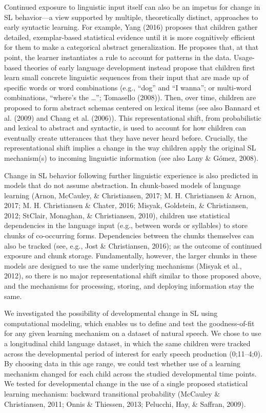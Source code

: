 \documentclass[man,mask,floatsintext]{apa6}
\begin{document}
Continued exposure to linguistic input itself can also be an impetus for
change in SL behavior---a view supported by multiple, theoretically
distinct, approaches to early syntactic learning. For example, Yang
(2016) proposes that children gather detailed, exemplar-based
statistical evidence until it is more cognitively efficient for them to
make a categorical abstract generalization. He proposes that, at that
point, the learner instantiates a rule to account for patterns in the
data. Usage-based theories of early language development instead propose
that children first learn small concrete linguistic sequences from their
input that are made up of specific words or word combinations (e.g.,
\enquote{dog} and \enquote{I wanna}; or multi-word combinations,
\enquote{where's the \ldots{}}; Tomasello (2008)). Then, over time,
children are proposed to form abstract schemas centered on lexical items
(see also Bannard et al. (2009) and Chang et al. (2006)). This
representational shift, from probabilistic and lexical to abstract and
syntactic, is used to account for how children can eventually create
utterances that they have never heard before. Crucially, the
representational shift implies a change in the way children apply the
original SL mechanism(s) to incoming linguistic information (see also
Lany \& Gómez, 2008).

Change in SL behavior following further linguistic experience is also
predicted in models that do not assume abstraction. In chunk-based
models of language learning (Arnon, McCauley, \& Christiansen, 2017; M.
H. Christiansen \& Arnon, 2017; M. H. Christiansen \& Chater, 2016;
Misyak, Goldstein, \& Christiansen, 2012; StClair, Monaghan, \&
Christiansen, 2010), children use statistical dependencies in the
language input (e.g., between words or syllables) to store chunks of
co-occurring forms. Dependencies between the chunks themselves can also
be tracked (see, e.g., Jost \& Christiansen, 2016); as the outcome of
continued exposure and chunk storage. Fundamentally, however, the larger
chunks in these models are designed to use the same underlying
mechanisms (Misyak et al., 2012), so there is no major representational
shift similar to those proposed above, and the mechanisms for
processing, storing, and deploying information stay the same.

We investigated the possibility of developmental change in SL using
computational modeling, which enables us to define and test the
goodness-of-fit for any given learning mechanism on a dataset of natural
speech. We chose to use a longitudinal child language dataset, in which
the same children were tracked across the developmental period of
interest for early speech production (0;11--4;0). By choosing data in
this age range, we could test whether use of a learning mechanism
changed for each child across the studied developmental time points. We
tested for developmental change in the use of a single proposed
statistical learning mechanism: backward transitional probability
(McCauley \& Christiansen, 2011; Onnis \& Thiessen, 2013; Pelucchi, Hay,
\& Saffran, 2009).
\end{document}
